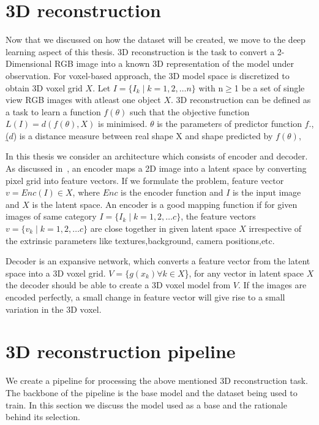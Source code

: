 \section{3D reconstruction}\label{sec:3D reconstruction}
Now that we discussed on how the dataset will be created, we move to the deep learning aspect of this thesis.
3D reconstruction is the task to convert a 2-Dimensional RGB image into a known 3D representation of the model under observation.
For voxel-based approach, the 3D model space is discretized to obtain 3D voxel grid $X$.
Let $I = \{I_k \mid k = 1,2,\dots n\}$ with n$\geq$1 be a set of single view RGB images with atleast one object $X$.
3D reconstruction can be defined as a task to learn a function $f(\theta)$ such that the objective function $L(I) = d(f(\theta),X)$ is minimised.
$\theta$ is the parameters of predictor function $f$., \b($d$) is a distance measure between real shape X and shape predicted by $f(\theta)$,

In this thesis we consider an architecture which consists of encoder and decoder.
As discussed in~\cite{Han2021ImageBased3O}, an encoder maps a 2D image into a latent space by converting pixel grid into feature vectors.
If we formulate the problem, feature vector $v= Enc(I) \in X$, where $Enc$ is the encoder function and $I$ is the input image and $X$ is the latent space.
An encoder is a good mapping function if for given images of same category $I = \{I_k \mid k = 1,2,\dots c\}$, the feature vectors $v = \{v_k \mid k = 1,2,\dots c\}$ are close together in given latent space $X$
irrespective of the extrinsic parameters like textures,background, camera positions,etc.

Decoder is an expansive network, which converts a feature vector from the latent space into a 3D voxel grid.
$V = \{g(x_k) \forall k \in X$\}, for any vector in latent space $X$ the decoder should be able to create a 3D voxel model from $V$.
If the images are encoded perfectly, a small change in feature vector will give rise to a small variation in the 3D voxel.

\section{3D reconstruction pipeline}\label{sec:3D reconstruction pipeline}
We create a pipeline for processing the above mentioned 3D reconstruction task.
The backbone of the pipeline is the base model and the dataset being used to train.
In this section we discuss the model used as a base and the rationale behind its selection.

